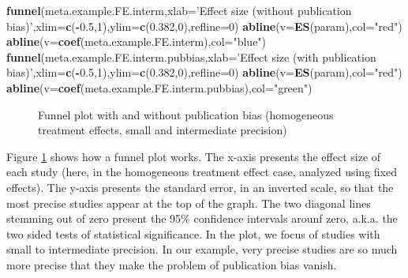 \documentclass[]{book}
\newenvironment{Shaded}{\begin{snugshade}}{\end{snugshade}}
\newcommand{\DataTypeTok}[1]{\textcolor[rgb]{0.13,0.29,0.53}{#1}}
\newcommand{\DecValTok}[1]{\textcolor[rgb]{0.00,0.00,0.81}{#1}}
\newcommand{\FloatTok}[1]{\textcolor[rgb]{0.00,0.00,0.81}{#1}}
\newcommand{\KeywordTok}[1]{\textcolor[rgb]{0.13,0.29,0.53}{\textbf{#1}}}
\newcommand{\NormalTok}[1]{#1}
\newcommand{\OperatorTok}[1]{\textcolor[rgb]{0.81,0.36,0.00}{\textbf{#1}}}
\newcommand{\StringTok}[1]{\textcolor[rgb]{0.31,0.60,0.02}{#1}}
\theoremstyle{definition}
\theoremstyle{definition}
\theoremstyle{definition}
\theoremstyle{remark}
\begin{document}
\begin{Shaded}
\begin{Highlighting}[]
\KeywordTok{funnel}\NormalTok{(meta.example.FE.interm,}\DataTypeTok{xlab=}\StringTok{'Effect size (without publication bias)'}\NormalTok{,}\DataTypeTok{xlim=}\KeywordTok{c}\NormalTok{(}\OperatorTok{-}\FloatTok{0.5}\NormalTok{,}\DecValTok{1}\NormalTok{),}\DataTypeTok{ylim=}\KeywordTok{c}\NormalTok{(}\FloatTok{0.382}\NormalTok{,}\DecValTok{0}\NormalTok{),}\DataTypeTok{refline=}\DecValTok{0}\NormalTok{)}
\KeywordTok{abline}\NormalTok{(}\DataTypeTok{v=}\KeywordTok{ES}\NormalTok{(param),}\DataTypeTok{col=}\StringTok{"red"}\NormalTok{)}
\KeywordTok{abline}\NormalTok{(}\DataTypeTok{v=}\KeywordTok{coef}\NormalTok{(meta.example.FE.interm),}\DataTypeTok{col=}\StringTok{"blue"}\NormalTok{)}
\KeywordTok{funnel}\NormalTok{(meta.example.FE.interm.pubbias,}\DataTypeTok{xlab=}\StringTok{'Effect size (with publication bias)'}\NormalTok{,}\DataTypeTok{xlim=}\KeywordTok{c}\NormalTok{(}\OperatorTok{-}\FloatTok{0.5}\NormalTok{,}\DecValTok{1}\NormalTok{),}\DataTypeTok{ylim=}\KeywordTok{c}\NormalTok{(}\FloatTok{0.382}\NormalTok{,}\DecValTok{0}\NormalTok{),}\DataTypeTok{refline=}\DecValTok{0}\NormalTok{)}
\KeywordTok{abline}\NormalTok{(}\DataTypeTok{v=}\KeywordTok{ES}\NormalTok{(param),}\DataTypeTok{col=}\StringTok{"red"}\NormalTok{)}
\KeywordTok{abline}\NormalTok{(}\DataTypeTok{v=}\KeywordTok{coef}\NormalTok{(meta.example.FE.interm.pubbias),}\DataTypeTok{col=}\StringTok{"green"}\NormalTok{)}
\end{Highlighting}
\end{Shaded}

\begin{figure}[htbp]

{\centering {}

}

\caption{Funnel plot with and without publication bias (homogeneous treatment effects, small and intermediate precision)}\label{fig:FunnelPlotFE}
\end{figure}

Figure \ref{fig:FunnelPlotFE} shows how a funnel plot works.
The x-axis presents the effect size of each study (here, in the homogeneous treatment effect case, analyzed using fixed effects).
The y-axis presents the standard error, in an inverted scale, so that the most precise studies appear at the top of the graph.
The two diagonal lines stemming out of zero present the 95\% confidence intervals arounf zero, a.k.a. the two sided tests of statistical significance.
In the plot, we focus of studies with small to intermediate precision.
In our example, very precise studies are so much more precise that they make the problem of publication bias vanish.
\end{document}
